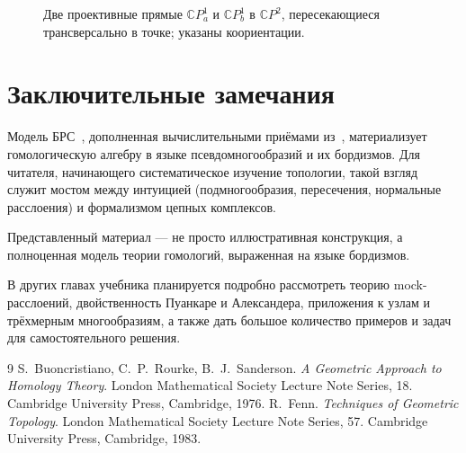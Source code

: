 \documentclass[12pt]{article}
\begin{document}
\begin{figure}
    \centering
    \caption{Две проективные прямые $\mathbb{C}P^1_a$ и $\mathbb{C}P^1_b$ в $\mathbb{C}P^2$, пересекающиеся трансверсально в точке; указаны коориентации.}\label{fig:cp2}
\end{figure}

\section{Заключительные замечания}

Модель БРС~\cite{BRS}, дополненная вычислительными приёмами из~\cite{Fenn}, материализует гомологическую алгебру в языке псевдомногообразий и их бордизмов. Для читателя, начинающего систематическое изучение топологии, такой взгляд служит мостом между интуицией (подмногообразия, пересечения, нормальные расслоения) и формализмом цепных комплексов.

Представленный материал — не просто иллюстративная конструкция, а полноценная модель теории гомологий, выраженная на языке бордизмов.

В других главах учебника планируется подробно рассмотреть теорию mock-расслоений, двойственность Пуанкаре и Александера, приложения к узлам и трёхмерным многообразиям, а также дать большое количество примеров и задач для самостоятельного решения.

\begin{thebibliography}{9}
 S.~Buoncristiano, C.~P.~Rourke, B.~J.~Sanderson.
\textit{A Geometric Approach to Homology Theory}.
London Mathematical Society Lecture Note Series, 18.
Cambridge University Press, Cambridge, 1976.
 R.~Fenn.
\textit{Techniques of Geometric Topology}.
London Mathematical Society Lecture Note Series, 57.
Cambridge University Press, Cambridge, 1983.
\end{thebibliography}
\end{document}
